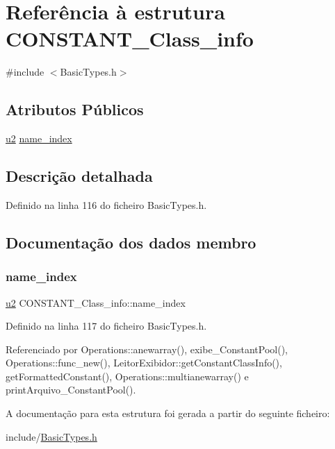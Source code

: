 \hypertarget{structCONSTANT__Class__info}{}\section{Referência à estrutura C\+O\+N\+S\+T\+A\+N\+T\+\_\+\+Class\+\_\+info}
\label{structCONSTANT__Class__info}


{\ttfamily \#include $<$Basic\+Types.\+h$>$}

\subsection*{Atributos Públicos}
\begin{DoxyCompactItemize}
\item 
\hyperlink{BasicTypes_8h_a732cde1300aafb73b0ea6c2558a7a54f}{u2} \hyperlink{structCONSTANT__Class__info_af37beebaf6ea2ba2d4b4d298d41d2904}{name\+\_\+index}
\end{DoxyCompactItemize}


\subsection{Descrição detalhada}


Definido na linha 116 do ficheiro Basic\+Types.\+h.



\subsection{Documentação dos dados membro}
\mbox{\label{structCONSTANT__Class__info_af37beebaf6ea2ba2d4b4d298d41d2904}} 
\subsubsection{\texorpdfstring{name\+\_\+index}{name\_index}}
{\footnotesize\ttfamily \hyperlink{BasicTypes_8h_a732cde1300aafb73b0ea6c2558a7a54f}{u2} C\+O\+N\+S\+T\+A\+N\+T\+\_\+\+Class\+\_\+info\+::name\+\_\+index}



Definido na linha 117 do ficheiro Basic\+Types.\+h.



Referenciado por Operations\+::anewarray(), exibe\+\_\+\+Constant\+Pool(), Operations\+::func\+\_\+new(), Leitor\+Exibidor\+::get\+Constant\+Class\+Info(), get\+Formatted\+Constant(), Operations\+::multianewarray() e print\+Arquivo\+\_\+\+Constant\+Pool().



A documentação para esta estrutura foi gerada a partir do seguinte ficheiro\+:\begin{DoxyCompactItemize}
\item 
include/\hyperlink{BasicTypes_8h}{Basic\+Types.\+h}\end{DoxyCompactItemize}
